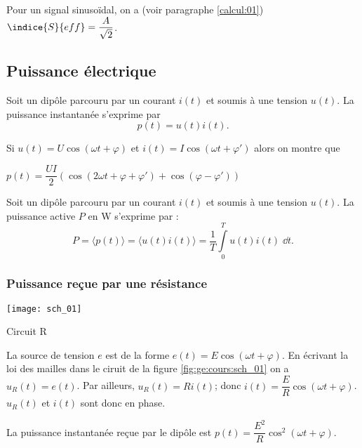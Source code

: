\begin{resultat}
Pour un signal sinusoïdal, on a (voir paragraphe \ref{calcul:01}) $\indice{S}{eff}= \dfrac{A}{\sqrt{2}}$.
\end{resultat}



\subsection{Puissance électrique}

\begin{defi}
Soit un dipôle parcouru par un courant $i(t)$ et soumis à une tension $u(t)$.
La puissance instantanée s'exprime par 
$$p(t)=u(t) i(t).$$

\end{defi}

\begin{resultat}
Si $u(t)=U\cos\left(\omega t + \varphi\right)$
et 
$i(t)=I\cos\left(\omega t + \varphi'\right)$ 
alors on montre que 

$p(t)=\dfrac{UI}{2}\left( \cos\left(2\omega t + \varphi + \varphi' \right)+\cos\left(\varphi -\varphi' \right)\right)$
\end{resultat}

\begin{defi}
Soit un dipôle parcouru par un courant $i(t)$ et soumis à une tension $u(t)$.
La puissance active $P$ en \si{W} s'exprime par :
$$P = \langle p(t) \rangle = \langle u(t) i(t) \rangle  =\dfrac{1}{T} \int\limits_{0}^{T} u(t) i(t)\; \dd t. $$
\end{defi}


\subsubsection{Puissance reçue par une résistance}
\begin{marginfigure}
\centering
\texttt{[image: sch\_01]}
\caption{Circuit R \label{fig:ge:cours:sch_01}}
\end{marginfigure}

La source de tension $e$ est de la forme $e(t)=E\cos\left(\omega t + \varphi\right)$. En écrivant la loi des mailles dans le ciruit de la figure \ref{fig:ge:cours:sch_01} on a $u_R(t)=e(t)$. Par ailleurs, $u_R(t) = R i(t)$; donc $i(t)=\dfrac{E}{R}\cos \left(\omega t + \varphi\right)$.
$u_R(t)$ et $i(t)$ sont donc en phase. 

La puissance instantanée reçue par le dipôle est $p(t) =\dfrac{E^2}{R}\cos^2 \left(\omega t + \varphi\right) $.

